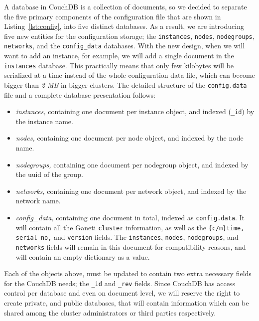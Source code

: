 \begin{description}
    A database in CouchDB is a collection of documents, so we decided to
    separate the five primary components of the configuration file that are
    shown in Listing~\ref{lst:config}, into five distinct databases. As a
    result, we are introducing five new entities for the configuration storage;
    the \texttt{instances}, \texttt{nodes}, \texttt{nodegroups},
    \texttt{networks}, and the \texttt{config\_data} databases. With the new
    design, when we will want to add an instance, for example, we will add a
    single document in the \texttt{instances} database. This practically means
    that only few kilobytes will be serialized at a time instead of the whole
    configuration data file, which can become bigger than \emph{2 MB} in bigger
    clusters. The detailed structure of the \texttt{config.data} file and a
    complete database presentation follows:

    \begin{itemize}
      \item \emph{instances,} containing one document per instance object, and
      indexed (\texttt{\_id}) by the instance name.
      \item \emph{nodes,} containing one document per node object, and indexed
      by the node name.
      \item \emph{nodegroups,} containing one document per nodegroup object, and
      indexed by the uuid of the group.
      \item \emph{networks,} containing one document per network object, and
      indexed by the network name.
      \item \emph{config\_data,} containing one document in total, indexed as
      \texttt{config.data}. It will contain all the Ganeti \texttt{cluster}
      information, as well as the \texttt{\{c/m\}time, serial\_no,} and
      \texttt{version} fields. The \texttt{instances}, \texttt{nodes},
      \texttt{nodegroups}, and \texttt{networks} fields will remain in this
      document for compatibility reasons, and will contain an empty dictionary
      as a value.
    \end{itemize}

    Each of the objects above, must be updated to contain two extra necessary
    fields for the CouchDB needs; the \texttt{\_id} and \texttt{\_rev} fields.
    Since CouchDB has access control per database and even on document level,
    we will reserve the right to create private, and public databases, that will
    contain information which can be shared among the cluster administrators
    or third parties respectively.\\


\end{description}
